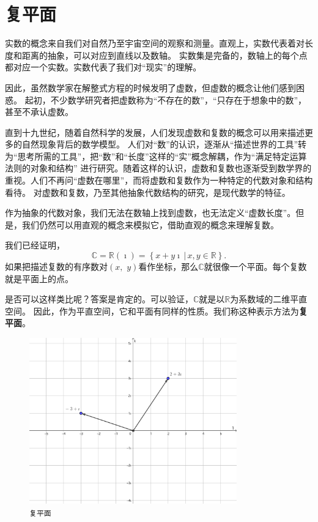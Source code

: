 \documentclass[12pt,UTF8]{ctexbook}
\begin{document}
\section{复平面}

实数的概念来自我们对自然乃至宇宙空间的观察和测量。直观上，实数代表着对长度和距离的抽象，可以对应到直线以及数轴。
实数集是完备的，数轴上的每个点都对应一个实数。实数代表了我们对“现实”的理解。

因此，虽然数学家在解整式方程的时候发明了虚数，但虚数的概念让他们感到困惑。
起初，不少数学研究者把虚数称为“不存在的数”，“只存在于想象中的数”，甚至不承认虚数。

直到十九世纪，随着自然科学的发展，人们发现虚数和复数的概念可以用来描述更多的自然现象背后的数学模型。
人们对“数”的认识，逐渐从“描述世界的工具”转为“思考所需的工具”，把“数”和“长度”这样的“实”概念解耦，作为“满足特定运算法则的对象和结构”
进行研究。随着这样的认识，虚数和复数也逐渐受到数学界的重视。人们不再问“虚数在哪里”，而将虚数和复数作为一种特定的代数对象和结构看待。
对虚数和复数，乃至其他抽象代数结构的研究，是现代数学的特征。

作为抽象的代数对象，我们无法在数轴上找到虚数，也无法定义“虚数长度”。但是，我们仍然可以用直观的概念来模拟它，借助直观的概念来理解复数。

我们已经证明，
$$\mathbb{C} = \mathbb{R}(\imath) = \left\{\left. x + y\imath \, \right| \, x, y \in \mathbb{R} \right\}. $$
如果把描述复数的有序数对$(x,\,\,y)$看作坐标，那么$\mathbb{C}$就很像一个平面。每个复数就是平面上的点。

是否可以这样类比呢？答案是肯定的。可以验证，$\mathbb{C}$就是以$\mathbb{R}$为系数域的二维平直空间。
因此，作为平直空间，它和平面有同样的性质。我们称这种表示方法为\textbf{复平面}。

\begin{figure}[h] 
    \centering
    \includegraphics[width=0.8\textwidth]{tu/复平面1.png}
    \caption*{\texttt{复平面}}
\end{figure}
\end{document}
